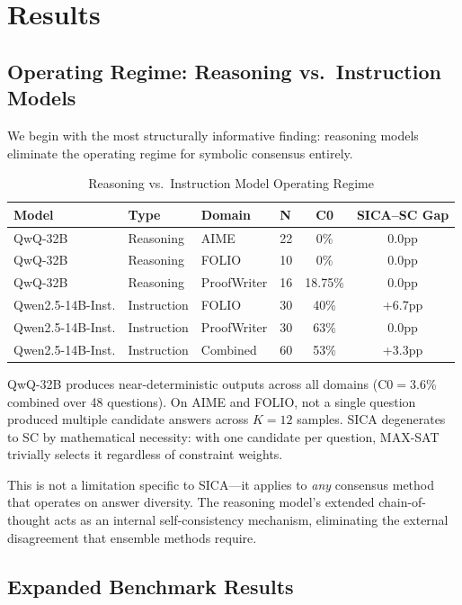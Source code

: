 \documentclass[11pt]{article}
\begin{document}
\section{Results}

\subsection{Operating Regime: Reasoning vs.\ Instruction Models}

We begin with the most structurally informative finding: reasoning models eliminate the operating regime for symbolic consensus entirely.

\begin{table}[h]
\centering
\caption{Reasoning vs.\ Instruction Model Operating Regime}
\label{tab:regime}
\begin{tabular}{llllcc}
\toprule
Model & Type & Domain & N & C0 & SICA--SC Gap \\
\midrule
QwQ-32B & Reasoning & AIME & 22 & 0\% & 0.0pp \\
QwQ-32B & Reasoning & FOLIO & 10 & 0\% & 0.0pp \\
QwQ-32B & Reasoning & ProofWriter & 16 & 18.75\% & 0.0pp \\
\midrule
Qwen2.5-14B-Inst. & Instruction & FOLIO & 30 & 40\% & +6.7pp \\
Qwen2.5-14B-Inst. & Instruction & ProofWriter & 30 & 63\% & 0.0pp \\
Qwen2.5-14B-Inst. & Instruction & Combined & 60 & 53\% & +3.3pp \\
\bottomrule
\end{tabular}
\end{table}

QwQ-32B produces near-deterministic outputs across all domains (C0$=$3.6\% combined over 48 questions). On AIME and FOLIO, not a single question produced multiple candidate answers across $K=12$ samples. SICA degenerates to SC by mathematical necessity: with one candidate per question, MAX-SAT trivially selects it regardless of constraint weights.

This is not a limitation specific to SICA---it applies to \emph{any} consensus method that operates on answer diversity. The reasoning model's extended chain-of-thought acts as an internal self-consistency mechanism, eliminating the external disagreement that ensemble methods require.

\subsection{Expanded Benchmark Results}
\end{document}
